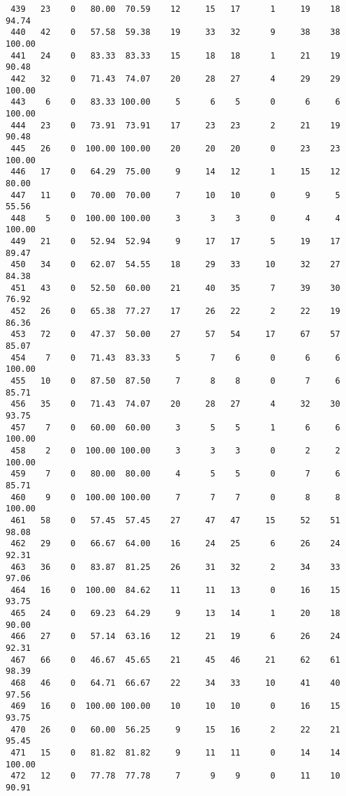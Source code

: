 \begin{verbatim}
 439   23    0   80.00  70.59    12     15   17      1     19    18    94.74
 440   42    0   57.58  59.38    19     33   32      9     38    38   100.00
 441   24    0   83.33  83.33    15     18   18      1     21    19    90.48
 442   32    0   71.43  74.07    20     28   27      4     29    29   100.00
 443    6    0   83.33 100.00     5      6    5      0      6     6   100.00
 444   23    0   73.91  73.91    17     23   23      2     21    19    90.48
 445   26    0  100.00 100.00    20     20   20      0     23    23   100.00
 446   17    0   64.29  75.00     9     14   12      1     15    12    80.00
 447   11    0   70.00  70.00     7     10   10      0      9     5    55.56
 448    5    0  100.00 100.00     3      3    3      0      4     4   100.00
 449   21    0   52.94  52.94     9     17   17      5     19    17    89.47
 450   34    0   62.07  54.55    18     29   33     10     32    27    84.38
 451   43    0   52.50  60.00    21     40   35      7     39    30    76.92
 452   26    0   65.38  77.27    17     26   22      2     22    19    86.36
 453   72    0   47.37  50.00    27     57   54     17     67    57    85.07
 454    7    0   71.43  83.33     5      7    6      0      6     6   100.00
 455   10    0   87.50  87.50     7      8    8      0      7     6    85.71
 456   35    0   71.43  74.07    20     28   27      4     32    30    93.75
 457    7    0   60.00  60.00     3      5    5      1      6     6   100.00
 458    2    0  100.00 100.00     3      3    3      0      2     2   100.00
 459    7    0   80.00  80.00     4      5    5      0      7     6    85.71
 460    9    0  100.00 100.00     7      7    7      0      8     8   100.00
 461   58    0   57.45  57.45    27     47   47     15     52    51    98.08
 462   29    0   66.67  64.00    16     24   25      6     26    24    92.31
 463   36    0   83.87  81.25    26     31   32      2     34    33    97.06
 464   16    0  100.00  84.62    11     11   13      0     16    15    93.75
 465   24    0   69.23  64.29     9     13   14      1     20    18    90.00
 466   27    0   57.14  63.16    12     21   19      6     26    24    92.31
 467   66    0   46.67  45.65    21     45   46     21     62    61    98.39
 468   46    0   64.71  66.67    22     34   33     10     41    40    97.56
 469   16    0  100.00 100.00    10     10   10      0     16    15    93.75
 470   26    0   60.00  56.25     9     15   16      2     22    21    95.45
 471   15    0   81.82  81.82     9     11   11      0     14    14   100.00
 472   12    0   77.78  77.78     7      9    9      0     11    10    90.91

\end{verbatim}
